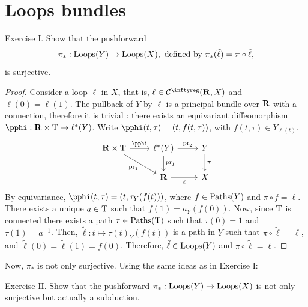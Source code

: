 \section{Loops bundles}

\begin{Article}{Exercise I.}{}
  Show that the pushforward
  $$%
    \pi_* : \Loops(Y) \to \Loops(X),
    \mbox{ defined by }
    \pi_*(\tilde \ell) = \pi \circ \tilde \ell,
    $$%
  is surjective.
\end{Article}

\begin{proof}
  Consider a loop $\ell$ in $X$,
  that is,
  $\ell \in \Cinfty(\RR,X)$ and $\ell(0)=\ell(1)$.
  The pullback of $Y$ by $\ell$ is a principal bundle over $\mathbf{R}$ with a connection,
  therefore it is trivial \cite[\textsection\,8.34]{PIZ13}:
  there exists an equivariant diffeomorphism $\pphi:\RR\times \Torus \to \ell^*(Y)$.
  Write $\pphi(t,\tau) = (t,f(t,\tau))$,
  with $f(t,\tau) \in Y_{\ell(t)}$.
  \[
  \begin{tikzcd}
    \RR \times \Torus \arrow{r}{\pphi} \arrow[swap]{dr}{\Proj_1} & \ell^*(Y) \arrow{d}{\Proj_1} \arrow{r}{\Proj_2}       & Y  \arrow{d}{\pi} \\
    & \RR \arrow{r}[swap]{\ell} & X
  \end{tikzcd}
  \]
  By equivariance,
  $\pphi(t,\tau)=(t,\tau_Y(f(t)))$,
  where $f\in \operatorname{Paths}(Y)$ and $\pi\circ f= \ell$.
  There exists a unique $a\in \mathrm{T}$ such that $f(1)=a_Y(f(0))$.
  Now,
  since $\mathrm{T}$ is connected there exists a path $\tau \in \operatorname{Paths}(\mathrm{T})$ such that $\tau(0)=1$ and $\tau(1) = a^{-1}$.
  Then,
  $\tilde \ell: t \mapsto \tau(t)_Y(f(t))$ is a path in $Y$ such that $\pi \circ \tilde \ell = \ell$,
  and $\tilde \ell(0)=\tilde \ell(1)=f(0)$.
  Therefore,
  $\tilde \ell \in \operatorname{Loops}(Y)$ and $\pi \circ \tilde \ell = \ell$.
\end{proof}

Now, $\pi_*$ is not only surjective. Using the same ideas as in Exercise I:

\begin{Article}{Exercise II.}{}
  Show that the pushforward $\pi_* : \operatorname{Loops}(Y) \to \operatorname{Loops}(X)$ is not only surjective but actually a subduction.
\end{Article}

